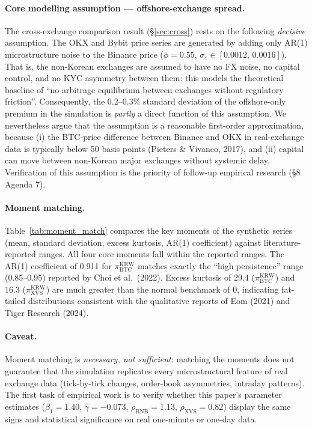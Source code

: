 \documentclass[11pt,a4paper]{article}
\begin{document}
\paragraph{Core modelling assumption --- offshore-exchange spread.}
The cross-exchange comparison result (\S\ref{sec:cross}) rests on the following \emph{decisive}
assumption. The OKX and Bybit price series are generated by adding only AR(1) microstructure noise
to the Binance price ($\phi=0.55$, $\sigma_\varepsilon \in [0.0012,\, 0.0016]$). That is, the
non-Korean exchanges are assumed to have no FX noise, no capital control, and no KYC asymmetry
between them: this models the theoretical baseline of ``no-arbitrage equilibrium between exchanges
without regulatory friction''. Consequently, the 0.2--0.3\% standard deviation of the
offshore-only premium in the simulation is \emph{partly} a direct function of this assumption. We
nevertheless argue that the assumption is a reasonable first-order approximation, because (i) the
BTC-price difference between Binance and OKX in real-exchange data is typically below 50 basis
points (Pieters \& Vivanco, 2017), and (ii) capital can move between non-Korean major exchanges
without systemic delay. Verification of this assumption is the priority of follow-up empirical
research (\S 8 Agenda 7).

\paragraph{Moment matching.}
Table~\ref{tab:moment_match} compares the key moments of the synthetic series (mean, standard
deviation, excess kurtosis, AR(1) coefficient) against literature-reported ranges. All four core
moments fall within the reported ranges. The AR(1) coefficient of 0.911 for $\pi^{\text{KRW}}_{\text{BTC}}$
matches exactly the ``high persistence'' range (0.85--0.95) reported by Choi et al.\ (2022). Excess
kurtosis of 29.4 ($\pi^{\text{KRW}}_{\text{BTC}}$) and 16.3 ($\pi^{\text{KRW}}_{\text{XVS}}$) are
much greater than the normal benchmark of 0, indicating fat-tailed distributions consistent with
the qualitative reports of Eom (2021) and Tiger Research (2024).

\begin{table}[H]
\centering
\caption{Moment matching: synthetic series vs literature.}
\label{tab:moment_match}
\small

\end{table}

\paragraph{Caveat.}
Moment matching is \emph{necessary, not sufficient}: matching the moments does not guarantee that
the simulation replicates every microstructural feature of real exchange data (tick-by-tick changes,
order-book asymmetries, intraday patterns). The first task of empirical work is to verify whether
this paper's parameter estimates ($\beta_1=1.40$, $\hat\gamma=-0.073$,
$\rho_{\text{BNB}}=1.13$, $\rho_{\text{XVS}}=0.82$) display the same signs and statistical
significance on real one-minute or one-day data.
\end{document}
